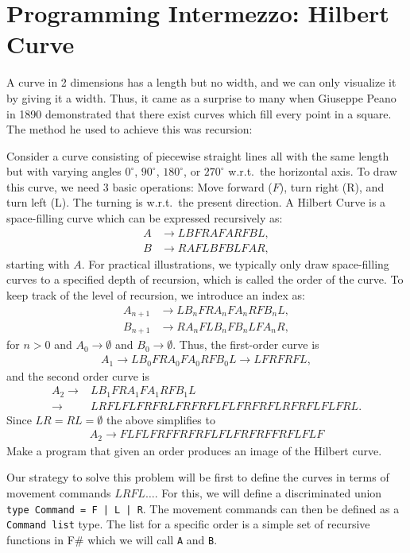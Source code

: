 \documentclass[fsharpnotes.tex]{subfiles}
\begin{document}
\section{Programming Intermezzo: Hilbert Curve}
A curve in 2 dimensions has a length but no width, and we can only visualize it by giving it a width. Thus, it came as a surprise to many when Giuseppe Peano in 1890 demonstrated that there exist curves which fill every point in a square. The method he used to achieve this was recursion:
\begin{problem}
  Consider a curve consisting of piecewise straight lines all with the same length but with varying angles $0^{\circ}$, $90^{\circ}$, $180^{\circ}$, or $270^{\circ}$ w.r.t.\ the horizontal axis. To draw this curve, we need 3 basic operations: Move forward ($F$), turn right (R), and turn left (L). The turning is w.r.t.\ the present direction. A Hilbert Curve is a space-filling curve which can be expressed recursively as:
\begin{align}
  A &\rightarrow LBFRAFARFBL,\label{eq:hilbertA}\\
  B &\rightarrow RAFLBFBLFAR,\label{eq:hilbertB}
\end{align}
starting with $A$. For practical illustrations, we typically only draw space-filling curves to a specified depth of recursion, which is called the order of the curve. To keep track of the level of recursion, we introduce an index as:
\begin{align*}
  A_{n+1} &\rightarrow LB_nFRA_nFA_nRFB_nL,\\
  B_{n+1} &\rightarrow RA_nFLB_nFB_nLFA_nR,
\end{align*}
for $n>0$ and $A_0\rightarrow\emptyset$ and $B_0\rightarrow\emptyset$. Thus, the first-order curve is
\begin{align*}
  A_1 \rightarrow LB_0FRA_0FA_0RFB_0L \rightarrow LFRFRFL,
\end{align*}
and the second order curve is
\begin{align*}
  A_2 
  \rightarrow &LB_1FRA_1FA_1RFB_1L \\
  \rightarrow &LRFLFLFRFRLFRFRFLFLFRFRFLRFRFLFLFRL.
\end{align*}
Since $LR = RL = \emptyset$ the above simplifies to
\begin{align*}
  A_2 \rightarrow FLFLFRFFRFRFLFLFRFRFFRFLFLF
\end{align*}
Make a program that given an order produces an image of the Hilbert curve.
\end{problem}
Our strategy to solve this problem will be first to define the curves in terms of movement commands $LRFL\ldots$. For this, we will define a discriminated union
\lstinline{type Command = F | L | R}. The movement commands can then be defined as a \lstinline{Command list} type. The list for a specific order is a simple set of recursive functions in F\# which we will call \lstinline{A} and \lstinline{B}.
\end{document}
